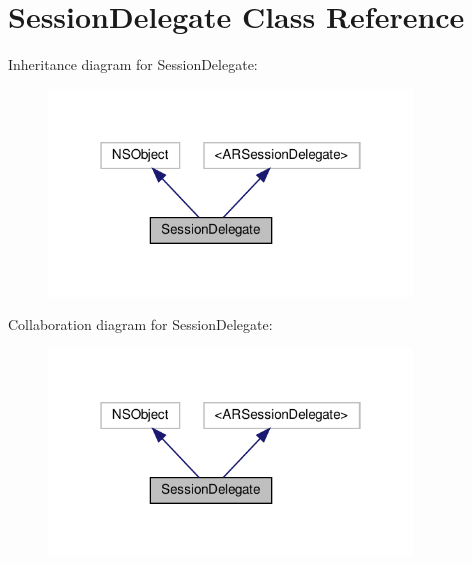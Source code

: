 \hypertarget{interfaceSessionDelegate}{}\section{Session\+Delegate Class Reference}
\label{interfaceSessionDelegate}


Inheritance diagram for Session\+Delegate\+:
\nopagebreak
\begin{figure}[H]
\begin{center}
\leavevmode
\includegraphics[width=274pt]{interfaceSessionDelegate__inherit__graph}
\end{center}
\end{figure}


Collaboration diagram for Session\+Delegate\+:
\nopagebreak
\begin{figure}[H]
\begin{center}
\leavevmode
\includegraphics[width=274pt]{interfaceSessionDelegate__coll__graph}
\end{center}
\end{figure}
